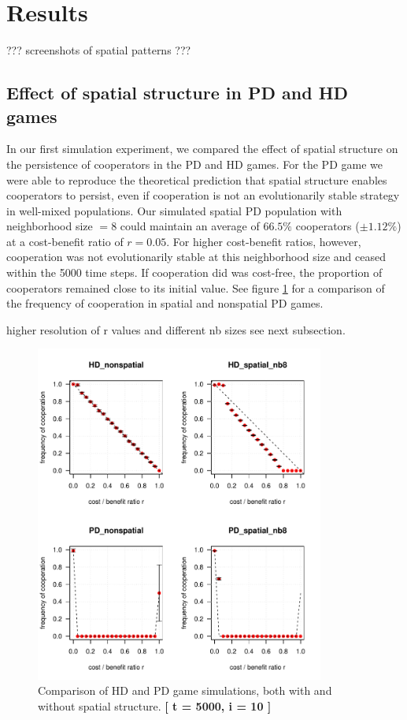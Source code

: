 
\section{Results}

??? screenshots of spatial patterns ???


\subsection{Effect of spatial structure in PD and HD games}

In our first simulation experiment, we compared the effect of spatial structure on the persistence of cooperators in the PD and HD games. For the PD game we were able to reproduce the theoretical prediction that spatial structure enables cooperators to persist, even if cooperation is not an evolutionarily stable strategy in well-mixed populations. Our simulated spatial PD population with neighborhood size $= 8$ could maintain an average of $66.5\%$ cooperators ($\pm 1.12 \%$) at a cost-benefit ratio of $r = 0.05$. For higher cost-benefit ratios, however, cooperation was not evolutionarily stable at this neighborhood size and ceased within the 5000 time steps. If cooperation did was cost-free, the proportion of cooperators remained close to its initial value. See figure \ref{fig: task1_4plot} for a comparison of the frequency of cooperation in spatial and nonspatial PD games.


higher resolution of r values and different nb sizes see next subsection.


\begin{figure}[H]
	\centering 
	\includegraphics[width=9.5cm]{task1_4plot}
	\caption{Comparison of HD and PD game simulations, both with and without spatial structure.  \textbf{[ t = 5000, i = 10 ]} }\label{fig: task1_4plot}
\end{figure}

